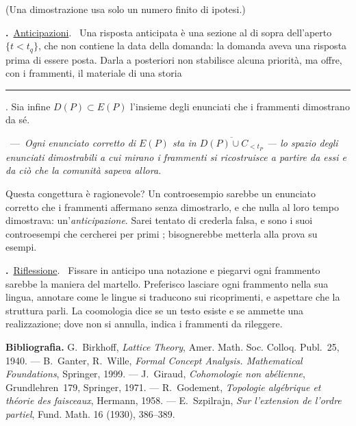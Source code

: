 \documentclass[10pt]{article}
\newcommand{\Cl}[1]{\overline{#1}}
\newcommand{\cache}[1]{\setbox0\hbox{#1}\rule[-0.32ex]{\wd0}{1.02em}}
\newcounter{no}
\newcommand{\para}[1]{\par\medskip\stepcounter{no}\textbf{\arabic{no}.}\ \uline{#1}.\ }
\newcommand{\enonce}[2]{\par\smallskip{\bfseries #1}\ ---\ \textit{#2}\par\smallskip}
\begin{document}
(Una dimostrazione usa solo un numero finito di ipotesi.)

\para{Anticipazioni} Una risposta anticipata è una sezione al di sopra dell'aperto
$\{t < t_q\}$, che non contiene la data della domanda: la domanda aveva una risposta prima di
essere posta. Darla a posteriori non stabilisce alcuna priorità, ma offre, con i frammenti, il
materiale di una \cache{storia}. Sia infine $D(P) \subset E(P)$ l'insieme degli
enunciati che i frammenti dimostrano da sé.

\enonce{Congettura}{Ogni enunciato corretto di $E(P)$ sta in $\Cl{D(P) \cup C_{<t_P}}$ --- lo
spazio degli enunciati dimostrabili a cui mirano i frammenti si ricostruisce a partire da essi e
da ciò che la comunità sapeva allora.}

Questa congettura è ragionevole? Un controesempio sarebbe un enunciato corretto che i frammenti affermano senza
dimostrarlo, e che nulla al loro tempo dimostrava: un'\emph{anticipazione}. Sarei tentato di
crederla falsa, e sono i suoi controesempi che cercherei per primi ; bisognerebbe metterla alla
prova su esempi.

\para{Riflessione} Fissare in anticipo una notazione e piegarvi ogni frammento sarebbe la maniera del martello.
Preferisco lasciare ogni frammento nella sua lingua, annotare come le lingue si traducono sui
ricoprimenti, e aspettare che la struttura parli. La coomologia dice se un testo esiste e se
ammette una realizzazione; dove non si annulla, indica i frammenti da rileggere.

\vspace{0.3em}
{\small\textbf{Bibliografia.}
G.~Birkhoff, \emph{Lattice Theory}, Amer. Math. Soc. Colloq. Publ.~25, 1940. ---
B.~Ganter, R.~Wille, \emph{Formal Concept Analysis. Mathematical Foundations}, Springer, 1999. ---
J.~Giraud, \emph{Cohomologie non abélienne}, Grundlehren~179, Springer, 1971. ---
R.~Godement, \emph{Topologie algébrique et théorie des faisceaux}, Hermann, 1958. ---
E.~Szpilrajn, \emph{Sur l'extension de l'ordre partiel}, Fund. Math. 16 (1930), 386--389.\par}
\end{document}
